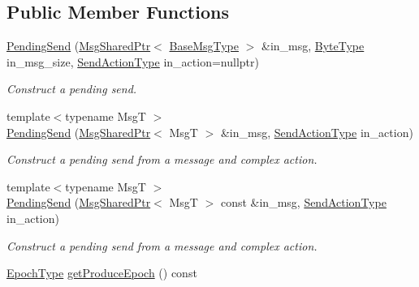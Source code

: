 \subsection*{Public Member Functions}
\begin{DoxyCompactItemize}
\item 
\hyperlink{structvt_1_1messaging_1_1_pending_send_a7ea1d6401329b5f2a1f2f4ca8d4fed40}{Pending\+Send} (\hyperlink{structvt_1_1messaging_1_1_msg_shared_ptr}{Msg\+Shared\+Ptr}$<$ \hyperlink{namespacevt_a44d0d4e144748f2b19a1cfd962f50338}{Base\+Msg\+Type} $>$ \&in\+\_\+msg, \hyperlink{namespacevt_aab8d55968084610ce3b17057981e9300}{Byte\+Type} in\+\_\+msg\+\_\+size, \hyperlink{structvt_1_1messaging_1_1_pending_send_aa13248a342d68230048cde8e0756851c}{Send\+Action\+Type} in\+\_\+action=nullptr)
\begin{DoxyCompactList}\small\item\em Construct a pending send. \end{DoxyCompactList}\item 
{\footnotesize template$<$typename MsgT $>$ }\\\hyperlink{structvt_1_1messaging_1_1_pending_send_a3409d31fed95e39a9a829f120cba8650}{Pending\+Send} (\hyperlink{structvt_1_1messaging_1_1_msg_shared_ptr}{Msg\+Shared\+Ptr}$<$ MsgT $>$ \&in\+\_\+msg, \hyperlink{structvt_1_1messaging_1_1_pending_send_aa13248a342d68230048cde8e0756851c}{Send\+Action\+Type} in\+\_\+action)
\begin{DoxyCompactList}\small\item\em Construct a pending send from a message and complex action. \end{DoxyCompactList}\item 
{\footnotesize template$<$typename MsgT $>$ }\\\hyperlink{structvt_1_1messaging_1_1_pending_send_a5ea6cde20221a525b411e4838de2ed6e}{Pending\+Send} (\hyperlink{structvt_1_1messaging_1_1_msg_shared_ptr}{Msg\+Shared\+Ptr}$<$ MsgT $>$ const \&in\+\_\+msg, \hyperlink{structvt_1_1messaging_1_1_pending_send_aa13248a342d68230048cde8e0756851c}{Send\+Action\+Type} in\+\_\+action)
\begin{DoxyCompactList}\small\item\em Construct a pending send from a message and complex action. \end{DoxyCompactList}\item 
\hyperlink{namespacevt_a985a5adf291c34a3ca263b3378388236}{Epoch\+Type} \hyperlink{structvt_1_1messaging_1_1_pending_send_a6e6d77bd24d90496826371b900d1979b}{get\+Produce\+Epoch} () const

\end{DoxyCompactItemize}

